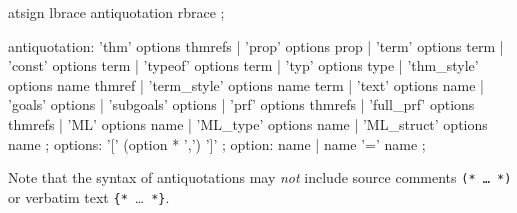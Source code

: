 \begin{rail}
  atsign lbrace antiquotation rbrace
  ;

  antiquotation:
    'thm' options thmrefs |
    'prop' options prop |
    'term' options term |
    'const' options term |
    'typeof' options term |
    'typ' options type |
    'thm\_style' options name thmref |
    'term\_style' options name term |
    'text' options name |
    'goals' options |
    'subgoals' options |
    'prf' options thmrefs |
    'full\_prf' options thmrefs |
    'ML' options name |
    'ML\_type' options name |
    'ML\_struct' options name
  ;
  options: '[' (option * ',') ']'
  ;
  option: name | name '=' name
  ;
\end{rail}

Note that the syntax of antiquotations may \emph{not} include source comments
\texttt{(*~\dots~*)} or verbatim text \verb|{*|~\dots~\verb|*}|.

